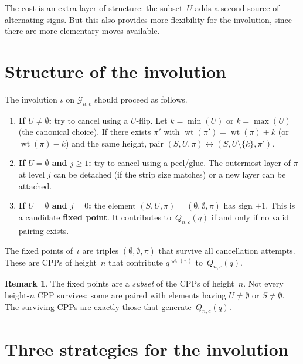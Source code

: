 \documentclass[11pt]{article}
\DeclareMathOperator{\wt}{wt}
\theoremstyle{plain}
\theoremstyle{definition}
\newtheorem{remark}[theorem]{Remark}
\begin{document}
The cost is an extra layer of structure: the subset~$U$
adds a second source of alternating signs.  But this also
provides more flexibility for the involution, since there
are more elementary moves available.


\section{Structure of the involution}
\label{sec:structure}

The involution $\iota$ on $\mathcal{G}_{n,c}$ should
proceed as follows.

\begin{enumerate}
  \item \textbf{If $U \neq \emptyset$:}
    try to cancel using a $U$-flip.
    Let $k = \min(U)$ or $k = \max(U)$ (the canonical
    choice).  If there exists $\pi'$ with
    $\wt(\pi') = \wt(\pi) + k$ (or $\wt(\pi) - k$) and
    the same height, pair
    $(S, U, \pi) \leftrightarrow (S, U \setminus \{k\}, \pi')$.

  \item \textbf{If $U = \emptyset$ and $j \geq 1$:}
    try to cancel using a peel/glue.
    The outermost layer of $\pi$ at level $j$ can be
    detached (if the strip size matches) or a new layer
    can be attached.

  \item \textbf{If $U = \emptyset$ and $j = 0$:}
    the element $(S, U, \pi) = (\emptyset, \emptyset, \pi)$
    has sign $+1$.  This is a candidate \textbf{fixed point}.
    It contributes to~$Q_{n,c}(q)$ if and only if no
    valid pairing exists.
\end{enumerate}

The fixed points of~$\iota$ are triples
$(\emptyset, \emptyset, \pi)$ that survive all
cancellation attempts.  These are CPPs of height~$n$
that contribute $q^{\wt(\pi)}$ to~$Q_{n,c}(q)$.

\begin{remark}
The fixed points are a \emph{subset} of the CPPs of
height~$n$.  Not every height-$n$ CPP survives: some
are paired with elements having $U \neq \emptyset$ or
$S \neq \emptyset$.  The surviving CPPs are exactly
those that generate~$Q_{n,c}(q)$.
\end{remark}


\section{Three strategies for the involution}
\label{sec:strategies}
\end{document}

